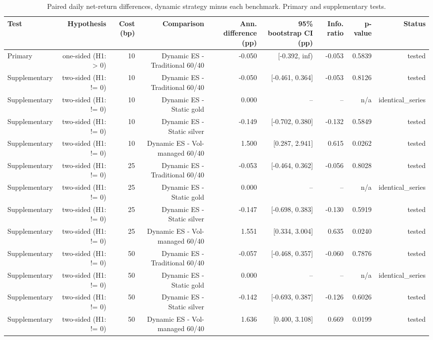 \begin{table}[htbp]
\centering
\caption{Paired daily net-return differences, dynamic strategy minus each benchmark. Primary and supplementary tests.}
\label{tab:inference}
\begin{tabular}{lrrrrrrrr}
\toprule
Test & Hypothesis & Cost (bp) & Comparison & Ann. difference (pp) & 95\% bootstrap CI (pp) & Info. ratio & p-value & Status \\
\midrule
Primary & one-sided (H1: > 0) & 10 & Dynamic ES - Traditional 60/40 & -0.050 & [-0.392, inf) & -0.053 & 0.5839 & tested \\
Supplementary & two-sided (H1: != 0) & 10 & Dynamic ES - Traditional 60/40 & -0.050 & [-0.461, 0.364] & -0.053 & 0.8126 & tested \\
Supplementary & two-sided (H1: != 0) & 10 & Dynamic ES - Static gold & 0.000 & -- & -- & n/a & identical\_series \\
Supplementary & two-sided (H1: != 0) & 10 & Dynamic ES - Static silver & -0.149 & [-0.702, 0.380] & -0.132 & 0.5849 & tested \\
Supplementary & two-sided (H1: != 0) & 10 & Dynamic ES - Vol-managed 60/40 & 1.500 & [0.287, 2.941] & 0.615 & 0.0262 & tested \\
Supplementary & two-sided (H1: != 0) & 25 & Dynamic ES - Traditional 60/40 & -0.053 & [-0.464, 0.362] & -0.056 & 0.8028 & tested \\
Supplementary & two-sided (H1: != 0) & 25 & Dynamic ES - Static gold & 0.000 & -- & -- & n/a & identical\_series \\
Supplementary & two-sided (H1: != 0) & 25 & Dynamic ES - Static silver & -0.147 & [-0.698, 0.383] & -0.130 & 0.5919 & tested \\
Supplementary & two-sided (H1: != 0) & 25 & Dynamic ES - Vol-managed 60/40 & 1.551 & [0.334, 3.004] & 0.635 & 0.0240 & tested \\
Supplementary & two-sided (H1: != 0) & 50 & Dynamic ES - Traditional 60/40 & -0.057 & [-0.468, 0.357] & -0.060 & 0.7876 & tested \\
Supplementary & two-sided (H1: != 0) & 50 & Dynamic ES - Static gold & 0.000 & -- & -- & n/a & identical\_series \\
Supplementary & two-sided (H1: != 0) & 50 & Dynamic ES - Static silver & -0.142 & [-0.693, 0.387] & -0.126 & 0.6026 & tested \\
Supplementary & two-sided (H1: != 0) & 50 & Dynamic ES - Vol-managed 60/40 & 1.636 & [0.400, 3.108] & 0.669 & 0.0199 & tested \\

\end{tabular}
\end{table}
